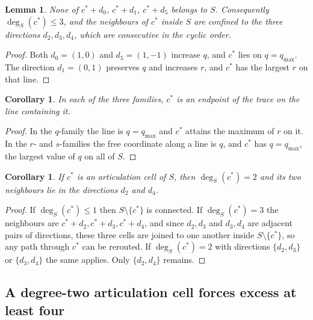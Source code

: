 \documentclass[11pt]{article}
\theoremstyle{plain}
\newtheorem{lemma}[theorem]{Lemma}
\newtheorem{corollary}[theorem]{Corollary}
\theoremstyle{definition}
\theoremstyle{remark}
\newcommand{\sm}{\setminus}
\begin{document}
\begin{lemma}\label{lem:local}
None of \(c^{*}+d_{0}\), \(c^{*}+d_{1}\), \(c^{*}+d_{5}\) belongs to \(S\). Consequently
\(\deg_{S}(c^{*})\le3\), and the neighbours of \(c^{*}\) inside \(S\) are confined to the
three directions \(d_{2},d_{3},d_{4}\), which are consecutive in the cyclic order.
\end{lemma}

\begin{proof}
Both \(d_{0}=(1,0)\) and \(d_{5}=(1,-1)\) increase \(q\), and \(c^{*}\) lies on
\(q=q_{\max}\). The direction \(d_{1}=(0,1)\) preserves \(q\) and increases \(r\), and
\(c^{*}\) has the largest \(r\) on that line.
\end{proof}

\begin{corollary}\label{cor:endpoint3}
In each of the three families, \(c^{*}\) is an endpoint of the trace on the line containing
it.
\end{corollary}

\begin{proof}
In the \(q\)-family the line is \(q=q_{\max}\) and \(c^{*}\) attains the maximum of \(r\) on
it. In the \(r\)- and \(s\)-families the free coordinate along a line is \(q\), and
\(c^{*}\) has \(q=q_{\max}\), the largest value of \(q\) on all of \(S\).
\end{proof}

\begin{corollary}\label{cor:art}
If \(c^{*}\) is an articulation cell of \(S\), then \(\deg_{S}(c^{*})=2\) and its two
neighbours lie in the directions \(d_{2}\) and \(d_{4}\).
\end{corollary}

\begin{proof}
If \(\deg_{S}(c^{*})\le1\) then \(S\sm\{c^{*}\}\) is connected. If \(\deg_{S}(c^{*})=3\) the
neighbours are \(c^{*}+d_{2},c^{*}+d_{3},c^{*}+d_{4}\), and since \(d_{2},d_{3}\) and
\(d_{3},d_{4}\) are adjacent pairs of directions, these three cells are joined to one
another inside \(S\sm\{c^{*}\}\), so any path through \(c^{*}\) can be rerouted. If
\(\deg_{S}(c^{*})=2\) with directions \(\{d_{2},d_{3}\}\) or \(\{d_{3},d_{4}\}\) the same
applies. Only \(\{d_{2},d_{4}\}\) remains.
\end{proof}

\subsection{A degree-two articulation cell forces excess at least four}\label{sec:11.3}
\end{document}
